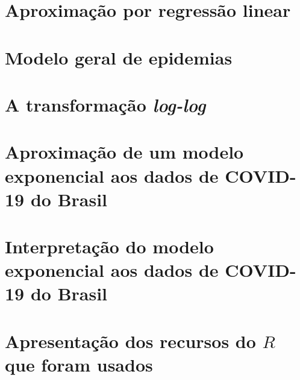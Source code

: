 \documentclass[a4paper,10pt]{article}
\begin{document}
\section{Aproximação por regressão linear}

\section{Modelo geral de epidemias}
\section{\texorpdfstring{A transformação {\em log-log}}
			{A transformação log-log}
	}
\section{Aproximação de um modelo exponencial aos dados de COVID-19 do Brasil}
\section{Interpretação do modelo exponencial aos dados de COVID-19 do Brasil}
\section{\texorpdfstring{Apresentação dos recursos do $R$ que foram usados}
			{Apresentação dos recursos do R que foram usados}
	}
\end{document}
